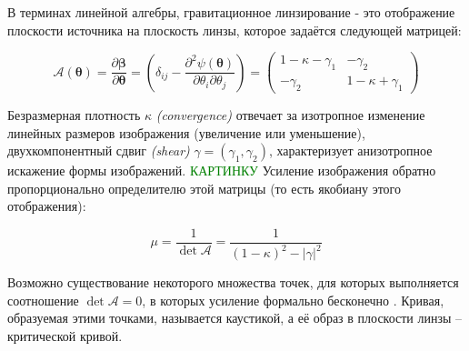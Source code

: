 
В терминах линейной алгебры, гравитационное линзирование - это отображение плоскости источника на плоскость линзы, которое задаётся следующей матрицей:

\begin{equation}
\mathcal{A}(\boldsymbol{\theta})=\frac{\partial \boldsymbol{\beta}}{\partial \boldsymbol{\theta}}=\left(\delta_{i j}-\frac{\partial^{2} \psi(\boldsymbol{\theta})}{\partial \theta_{i} \partial \theta_{j}}\right)=\left(\begin{array}{cc}{1-\kappa-\gamma_{1}} & {-\gamma_{2}} \\ {-\gamma_{2}} & {1-\kappa+\gamma_{1}}\end{array}\right)
\end{equation}

Безразмерная плотность  $\kappa$ \textit{(convergence)}  отвечает за изотропное изменение линейных размеров изображения (увеличение или уменьшение),  двухкомпонентный сдвиг \textit{(shear)} $\gamma=(\gamma_1,\gamma_2)$, характеризует анизотропное искажение формы изображений. \textcolor{green}{КАРТИНКУ} Усиление изображения обратно пропорционально определителю этой матрицы (то есть якобиану этого отображения):

\begin{equation}
\mu=\frac{1}{\operatorname{det} \mathcal{A}} =  \frac{1}{(1-\kappa)^2-|\gamma|^2}
\end{equation}

Возможно существование некоторого множества точек, для которых выполняется соотношение $\operatorname{det} \mathcal{A}=0$, в которых усиление формально бесконечно . Кривая, образуемая этими точками, называется каустикой, а её образ в плоскости линзы – критической кривой. 



 


